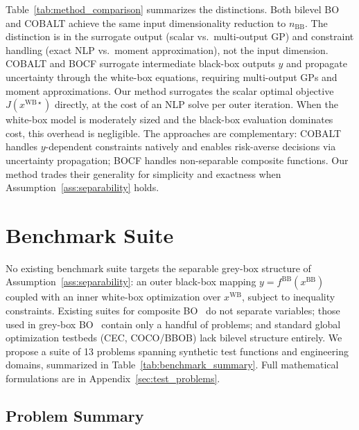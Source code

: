 \documentclass[12pt,a4paper]{article}%
\theoremstyle{plain}%
\theoremstyle{remark}%
\theoremstyle{definition}%
\def\WB{\mathrm{WB}}
\def\BB{\mathrm{BB}}
\begin{document}
Table~\ref{tab:method_comparison} summarizes the distinctions. Both bilevel BO and COBALT achieve the same input dimensionality reduction to $n_{\BB}$. The distinction is in the surrogate output (scalar vs.\ multi-output GP) and constraint handling (exact NLP vs.\ moment approximation), not the input dimension. COBALT and BOCF surrogate intermediate black-box outputs $y$ and propagate uncertainty through the white-box equations, requiring multi-output GPs and moment approximations. Our method surrogates the scalar optimal objective $J(x^{\WB\star})$ directly, at the cost of an NLP solve per outer iteration. When the white-box model is moderately sized and the black-box evaluation dominates cost, this overhead is negligible. The approaches are complementary: COBALT handles $y$-dependent constraints natively and enables risk-averse decisions via uncertainty propagation; BOCF handles non-separable composite functions. Our method trades their generality for simplicity and exactness when Assumption~\ref{ass:separability} holds.

\section{Benchmark Suite}\label{sec:benchmark_suite}

No existing benchmark suite targets the separable grey-box structure of Assumption~\ref{ass:separability}: an outer black-box mapping $y = f^{\BB}(x^{\BB})$ coupled with an inner white-box optimization over $x^{\WB}$, subject to inequality constraints. Existing suites for composite BO~\cite{astudillo2019bocf} do not separate variables; those used in grey-box BO~\cite{paulson2022cobalt} contain only a handful of problems; and standard global optimization testbeds (CEC, COCO/BBOB) lack bilevel structure entirely. We propose a suite of 13 problems spanning synthetic test functions and engineering domains, summarized in Table~\ref{tab:benchmark_summary}. Full mathematical formulations are in Appendix~\ref{sec:test_problems}.

\subsection{Problem Summary}\label{subsec:problem_summary}
\end{document}
